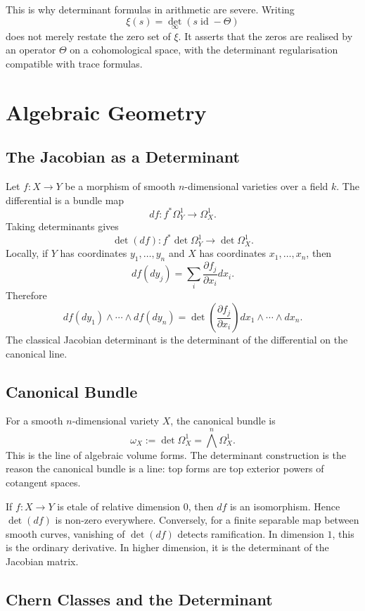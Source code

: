 \documentclass[11pt]{memoir}
\newcommand{\id}{\operatorname{id}}
\begin{document}
This is why determinant formulas in arithmetic are severe. Writing
\[
  \xi(s)=\det_\infty(s\id-\Theta)
\]
does not merely restate the zero set of \(\xi\). It asserts that the
zeros are realised by an operator \(\Theta\) on a cohomological space,
with the determinant regularisation compatible with trace formulas.

\chapter{Algebraic Geometry}
\label{ch:algebraic-geometry}

\section{The Jacobian as a Determinant}
\label{sec:jacobian}

Let \(f:X\to Y\) be a morphism of smooth \(n\)-dimensional varieties
over a field \(k\). The differential is a bundle map
\[
  df:f^*\Omega^1_Y\to\Omega^1_X.
\]
Taking determinants gives
\[
  \det(df):
  f^*\det\Omega^1_Y\longrightarrow \det\Omega^1_X.
\]
Locally, if \(Y\) has coordinates \(y_1,\dots,y_n\) and \(X\) has
coordinates \(x_1,\dots,x_n\), then
\[
  df(dy_j)=\sum_i\frac{\partial f_j}{\partial x_i}dx_i.
\]
Therefore
\[
  df(dy_1)\wedge\cdots\wedge df(dy_n)
  =
  \det\left(\frac{\partial f_j}{\partial x_i}\right)
  dx_1\wedge\cdots\wedge dx_n.
\]
The classical Jacobian determinant is the determinant of the
differential on the canonical line.

\section{Canonical Bundle}
\label{sec:canonical-bundle}

For a smooth \(n\)-dimensional variety \(X\), the canonical bundle is
\[
  \omega_X:=\det\Omega^1_X=\bigwedge^n\Omega^1_X.
\]
This is the line of algebraic volume forms. The determinant
construction is the reason the canonical bundle is a line: top
forms are top exterior powers of cotangent spaces.

If \(f:X\to Y\) is etale of relative dimension \(0\), then \(df\) is
an isomorphism. Hence \(\det(df)\) is non-zero everywhere. Conversely,
for a finite separable map between smooth curves, vanishing of
\(\det(df)\) detects ramification. In dimension \(1\), this is the
ordinary derivative. In higher dimension, it is the determinant of the
Jacobian matrix.

\section{Chern Classes and the Determinant}
\label{sec:chern-det}
\end{document}
